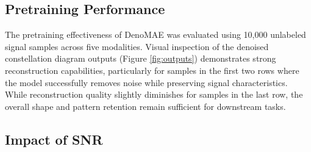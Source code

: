 \begin{table}[htbp]
\centering
\caption{Comparison of DenoMAE with other modulation classification methods}
\label{compare}
\end{table}


\subsection{Pretraining Performance}

The pretraining effectiveness of DenoMAE was evaluated using 10,000 unlabeled signal samples across five modalities. Visual inspection of the denoised constellation diagram outputs (Figure \ref{fig:outputs}) demonstrates strong reconstruction capabilities, particularly for samples in the first two rows where the model successfully removes noise while preserving signal characteristics. While reconstruction quality slightly diminishes for samples in the last row, the overall shape and pattern retention remain sufficient for downstream tasks.

\subsection{Impact of SNR}

